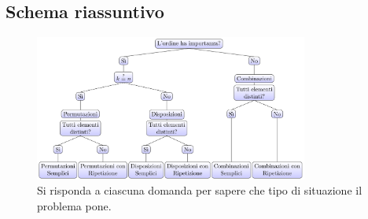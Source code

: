 \subsection{Schema riassuntivo}
\begin{figure}[h]
  \centering
  \includegraphics[width=9cm]{image/tree}
  \caption{Si risponda a ciascuna domanda per sapere che tipo di situazione il problema pone.}
\end{figure}
